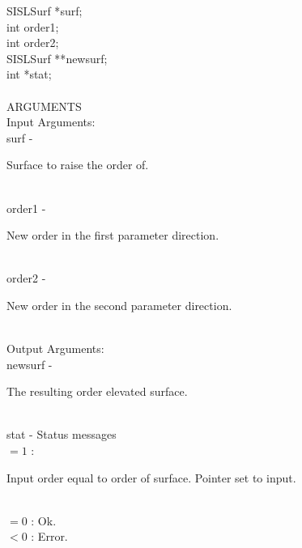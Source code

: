                 \>\>    SISLSurf        \>      *{\fov surf};\\
                \>\>    int     \>      {\fov order1};\\
                \>\>    int     \>      {\fov order2};\\
                \>\>    SISLSurf        \>      **{\fov newsurf};\\
                \>\>    int     \>      *{\fov stat};\\
\\
ARGUMENTS\\
        \>Input Arguments:\\
        \>\>    {\fov surf}\> - \>              \begin{minipg2}
                                Surface to raise the order of.
                                \end{minipg2}\\
        \>\>    {\fov order1}\> - \>            \begin{minipg2}
                                New order in the first parameter direction.
                                \end{minipg2}\\
        \>\>    {\fov order2}\> - \>            \begin{minipg2}
                                New order in the second parameter direction.
                                \end{minipg2}\\
        \>Output Arguments:\\
        \>\>    {\fov newsurf}\> - \>   \begin{minipg2}
                                The resulting order elevated surface.
                                \end{minipg2}\\
        \>\>    {\fov stat}     \> - \> Status messages\\
                \>\>\>\>\>      $= 1$   : \> \begin{minipg5}
                                                Input order equal to
                                                order of surface.
                                                Pointer set to input.
                                        \end{minipg5}\\[0.8ex]
                \>\>\>\>\>      $= 0$   : \>Ok.\\
                \>\>\>\>\>      $< 0$   : \>Error.\\
